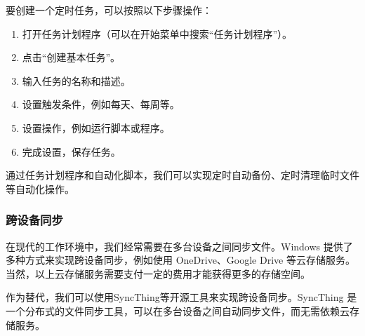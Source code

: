 \documentclass[../main.tex]{subfiles}
\begin{document}
要创建一个定时任务，可以按照以下步骤操作：
\begin{enumerate}
  \item 打开任务计划程序（可以在开始菜单中搜索“任务计划程序”）。
  \item 点击“创建基本任务”。
  \item 输入任务的名称和描述。
  \item 设置触发条件，例如每天、每周等。
  \item 设置操作，例如运行脚本或程序。
  \item 完成设置，保存任务。
\end{enumerate}

通过任务计划程序和自动化脚本，我们可以实现定时自动备份、定时清理临时文件等自动化操作。

\subsubsection{跨设备同步}

在现代的工作环境中，我们经常需要在多台设备之间同步文件。Windows 提供了多种方式来实现跨设备同步，例如使用 OneDrive、Google Drive 等云存储服务。当然，以上云存储服务需要支付一定的费用才能获得更多的存储空间。

作为替代，我们可以使用SyncThing等开源工具来实现跨设备同步。SyncThing 是一个分布式的文件同步工具，可以在多台设备之间自动同步文件，而无需依赖云存储服务。
\end{document}
